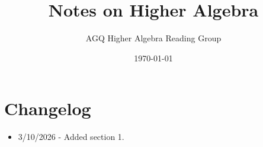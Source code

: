 \documentclass[12pt]{article}
\title{Notes on Higher Algebra}
\author{AGQ Higher Algebra Reading Group}
\date{\today}
\begin{document}
\maketitle

\section*{Changelog}
\begin{itemize}
    \item 3/10/2026 - Added section 1.
\end{itemize}

\tableofcontents

\newpage


\end{document}
